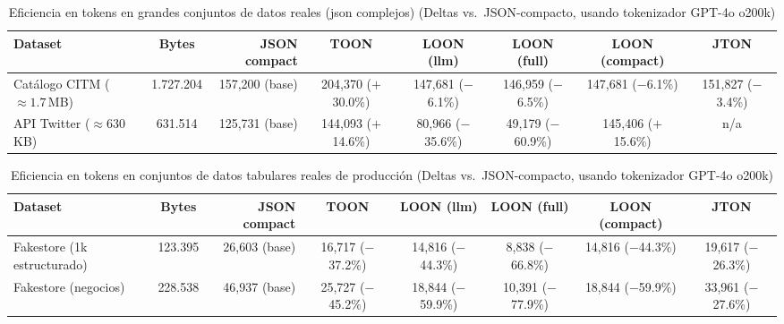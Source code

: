 
\begin{table}[htbp]
  \centering
  \caption{Eficiencia en tokens en grandes conjuntos de datos reales (json complejos) (Deltas vs.\ JSON-compacto, usando tokenizador GPT-4o o200k)}
  \label{tab:tokens-real-large}
  \tiny
  \setlength{\tabcolsep}{2pt}
  \begin{tabular}{@{}lcrccccc@{}}
    \toprule
    \textbf{Dataset} & \textbf{Bytes} & \textbf{JSON compact} & \textbf{TOON} & \textbf{LOON (llm)} & \textbf{LOON (full)} & \textbf{LOON (compact)} & \textbf{JTON} \\
    \midrule
    Catálogo CITM ($\approx 1.7$\,MB) & 1.727.204 & 157,200 {\scriptsize (base)} & 204,370 {\scriptsize ($+$30.0\%)} & 147,681 {\scriptsize ($-$6.1\%)} & 146,959 {\scriptsize ($-$6.5\%)} & 147,681 {\scriptsize ($-$6.1\%)} & 151,827 {\scriptsize ($-$3.4\%)} \\
    API Twitter ($\approx 630$\,KB) & 631.514 & 125,731 {\scriptsize (base)} & 144,093 {\scriptsize ($+$14.6\%)} & 80,966 {\scriptsize ($-$35.6\%)} & 49,179 {\scriptsize ($-$60.9\%)} & 145,406 {\scriptsize ($+$15.6\%)} & n/a \\
    \bottomrule
  \end{tabular}
\end{table}

\begin{table}[htbp]
  \centering
  \caption{Eficiencia en tokens en conjuntos de datos tabulares reales de producción (Deltas vs.\ JSON-compacto, usando tokenizador GPT-4o o200k)}
  \label{tab:tokens-real-tabular}
  \tiny
  \setlength{\tabcolsep}{2pt}
  \begin{tabular}{@{}lcrccccc@{}}
    \toprule
    \textbf{Dataset} & \textbf{Bytes} & \textbf{JSON compact} & \textbf{TOON} & \textbf{LOON (llm)} & \textbf{LOON (full)} & \textbf{LOON (compact)} & \textbf{JTON} \\
    \midrule
    Fakestore (1k estructurado) & 123.395 & 26,603 {\scriptsize (base)} & 16,717 {\scriptsize ($-$37.2\%)} & 14,816 {\scriptsize ($-$44.3\%)} & 8,838 {\scriptsize ($-$66.8\%)} & 14,816 {\scriptsize ($-$44.3\%)} & 19,617 {\scriptsize ($-$26.3\%)} \\
    Fakestore (negocios) & 228.538 & 46,937 {\scriptsize (base)} & 25,727 {\scriptsize ($-$45.2\%)} & 18,844 {\scriptsize ($-$59.9\%)} & 10,391 {\scriptsize ($-$77.9\%)} & 18,844 {\scriptsize ($-$59.9\%)} & 33,961 {\scriptsize ($-$27.6\%)} \\
    \bottomrule
  \end{tabular}
\end{table}

